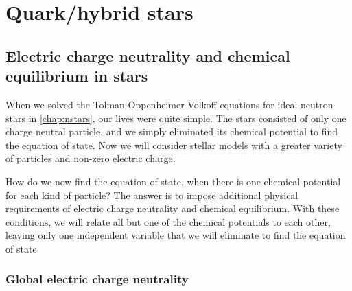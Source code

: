 \chapter{Quark/hybrid stars}




\section{Electric charge neutrality and chemical equilibrium in stars}


When we solved the Tolman-Oppenheimer-Volkoff equations for ideal neutron stars in \cref{chap:nstars}, our lives were quite simple.
The stars consisted of only one charge neutral particle, and we simply eliminated its chemical potential to find the equation of state.
Now we will consider stellar models with a greater variety of particles and non-zero electric charge.

How do we now find the equation of state, when there is one chemical potential for each kind of particle?
The answer is to impose additional physical requirements of electric charge neutrality and chemical equilibrium.
With these conditions, we will relate all but one of the chemical potentials to each other, leaving only one independent variable that we will eliminate to find the equation of state.

\subsection{Global electric charge neutrality}


